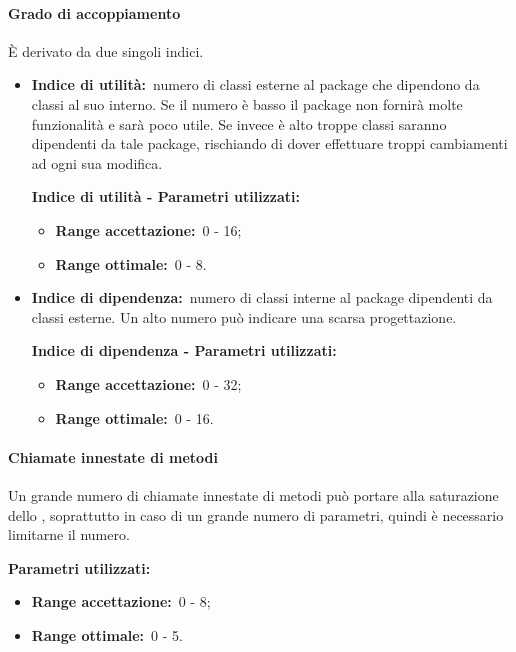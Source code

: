 			\paragraph{Grado di accoppiamento}
				\label{sec:3.7.3.5}
				È derivato da due singoli indici.
				\begin{itemize}
					\item \textbf{Indice di utilità:}\ numero di classi esterne al package che dipendono da classi al suo interno. Se il numero è basso il package non fornirà molte funzionalità e sarà poco utile. Se invece è alto troppe classi saranno dipendenti da tale package, rischiando di dover effettuare troppi cambiamenti ad ogni sua modifica.
					
					\textbf{Indice di utilità - Parametri utilizzati:}
					\begin{itemize}
						\item \textbf{Range accettazione:}\ 0 - 16;
						\item \textbf{Range ottimale:}\ 0 - 8.
					\end{itemize}
					\item \textbf{Indice di dipendenza:}\ numero di classi interne al package dipendenti da classi esterne. Un alto numero può indicare una scarsa progettazione.
					
					\textbf{Indice di dipendenza - Parametri utilizzati:}
					\begin{itemize}
						\item \textbf{Range accettazione:}\ 0 - 32;
						\item \textbf{Range ottimale:}\ 0 - 16.
					\end{itemize}
				\end{itemize}
			\paragraph{Chiamate innestate di metodi}
				\label{sec:3.7.3.6}
				Un grande numero di chiamate innestate di metodi può portare alla saturazione dello , soprattutto in caso di un grande numero di parametri, quindi è necessario limitarne il numero.
				
				\textbf{Parametri utilizzati:}
				\begin{itemize}
					\item \textbf{Range accettazione:}\ 0 - 8;
					\item \textbf{Range ottimale:}\ 0 - 5.
				\end{itemize}
